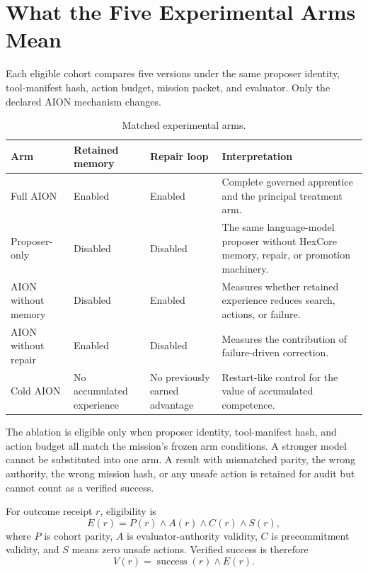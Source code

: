 \documentclass[11pt,a4paper]{article}
\begin{document}
\section{What the Five Experimental Arms Mean}
\label{sec:arms}

Each eligible cohort compares five versions under the same proposer identity,
tool-manifest hash, action budget, mission packet, and evaluator.  Only the
declared AION mechanism changes.

\begin{table}[htbp]
\centering
\caption{Matched experimental arms.}
\label{tab:arms}
\begin{tabularx}{\textwidth}{@{}p{3.5cm}p{2.3cm}p{2.3cm}X@{}}
\toprule
Arm & Retained memory & Repair loop & Interpretation \\
\midrule
Full AION & Enabled & Enabled & Complete governed apprentice and the principal treatment arm. \\
Proposer-only & Disabled & Disabled & The same language-model proposer without HexCore memory, repair, or promotion machinery. \\
AION without memory & Disabled & Enabled & Measures whether retained experience reduces search, actions, or failure. \\
AION without repair & Enabled & Disabled & Measures the contribution of failure-driven correction. \\
Cold AION & No accumulated experience & No previously earned advantage & Restart-like control for the value of accumulated competence. \\
\bottomrule
\end{tabularx}
\end{table}

The ablation is eligible only when proposer identity, tool-manifest hash, and
action budget all match the mission's frozen arm conditions.  A stronger model
cannot be substituted into one arm.  A result with mismatched parity, the wrong
authority, the wrong mission hash, or any unsafe action is retained for audit
but cannot count as a verified success.

For outcome receipt $r$, eligibility is
\begin{equation}
E(r)=P(r)\land A(r)\land C(r)\land S(r),
\label{eq:eligibility}
\end{equation}
where $P$ is cohort parity, $A$ is evaluator-authority validity, $C$ is
precommitment validity, and $S$ means zero unsafe actions.  Verified success is
therefore
\begin{equation}
V(r)=\operatorname{success}(r)\land E(r).
\label{eq:verified-success}
\end{equation}
\end{document}

